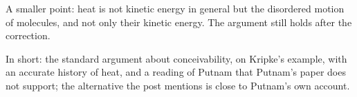 \begin{afterword}
A smaller point: heat is not kinetic energy in general but the disordered motion of molecules, and not only their kinetic energy. The argument still holds after the correction.

In short: the standard argument about conceivability, on Kripke's example, with an accurate history of heat, and a reading of Putnam that Putnam's paper does not support; the alternative the post mentions is close to Putnam's own account.
\end{afterword}
